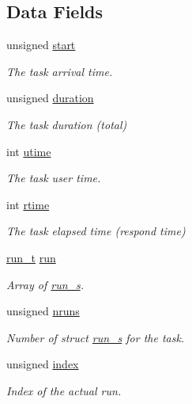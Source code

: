 \subsection*{Data Fields}
\begin{DoxyCompactItemize}
\item 
unsigned \hyperlink{structtask__s_ad69dba2449ece3f10eea4ed27af2e957}{start}
\begin{DoxyCompactList}\small\item\em The task arrival time. \end{DoxyCompactList}\item 
unsigned \hyperlink{structtask__s_a7621a6cb55465ce0be17f7e56c5aa908}{duration}
\begin{DoxyCompactList}\small\item\em The task duration (total) \end{DoxyCompactList}\item 
int \hyperlink{structtask__s_af436f2616e78fd2466cc8b1c59875653}{utime}
\begin{DoxyCompactList}\small\item\em The task user time. \end{DoxyCompactList}\item 
int \hyperlink{structtask__s_a159561283a0943e9a7f587ff1f413d99}{rtime}
\begin{DoxyCompactList}\small\item\em The task elapsed time (respond time) \end{DoxyCompactList}\item 
\hyperlink{tasks_8h_a6b451df7f4fd085ced3b05d94cdbbc2e}{run\-\_\-t} \hyperlink{structtask__s_a1436b6ae08fcebe2915050bc5874b938}{run}
\begin{DoxyCompactList}\small\item\em Array of \hyperlink{structrun__s}{run\-\_\-s}. \end{DoxyCompactList}\item 
unsigned \hyperlink{structtask__s_a8906d14cfe47645b29a2333b4b92c550}{nruns}
\begin{DoxyCompactList}\small\item\em Number of struct \hyperlink{structrun__s}{run\-\_\-s} for the task. \end{DoxyCompactList}\item 
unsigned \hyperlink{structtask__s_a0148e6caffa1e820ec07130799c22565}{index}
\begin{DoxyCompactList}\small\item\em Index of the actual run. \end{DoxyCompactList}\item 

\end{DoxyCompactItemize}
